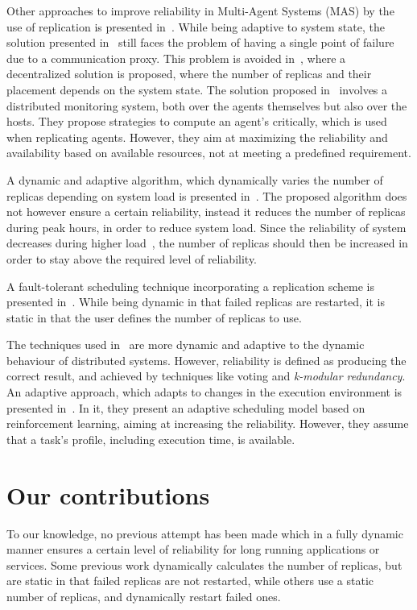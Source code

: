 \documentclass{cslthse-msc}
\begin{document}
Other approaches to improve reliability in Multi-Agent Systems (MAS) by the use of replication is presented in~\cite{replicatingAgents, adaptiveMASReplication, adaptiveAgentReplication}. While being adaptive to system state, the solution presented in~\cite{replicatingAgents} still faces the problem of having a single point of failure due to a communication proxy. This problem is avoided in~\cite{adaptiveMASReplication}, where a decentralized solution is proposed, where the number of replicas and their placement depends on the system state. %
The solution proposed in~\cite{adaptiveAgentReplication} involves a distributed monitoring system, both over the agents themselves but also over the hosts. They propose strategies to compute an agent's critically, which is used when replicating agents. However, they aim at maximizing the reliability and availability based on available resources, not at meeting a predefined requirement. %

A dynamic and adaptive algorithm, which dynamically varies the number of replicas depending on system load is presented in~\cite{adaptiveCheckPointAndRep}. The proposed algorithm does not however ensure a certain reliability, instead it reduces the number of replicas during peak hours, in order to reduce system load. Since the reliability of system decreases during higher load~\cite{studyOfFailures, implicationsOfFailures}, the number of replicas should then be increased in order to stay above the required level of reliability.

A fault-tolerant scheduling technique incorporating a replication scheme is presented in~\cite{faultTolerantSchedPolicy}. While being dynamic in that failed replicas are restarted, it is static in that the user defines the number of replicas to use.

The techniques used in~\cite{selfAdaptRel, dynAdaptRepl, relModelWebServices} are more dynamic and adaptive to the dynamic behaviour of distributed systems. However, reliability is defined as producing the correct result, and achieved by techniques like voting and \emph{k-modular redundancy}. An adaptive approach, which adapts to changes in the execution environment is presented in~\cite{imprRelAdaptRL}. In it, they present an adaptive scheduling model based on reinforcement learning, aiming at increasing the reliability. However, they assume that a task's profile, including execution time, is available.

\section{Our contributions} \label{sec:introduction_contributions}
To our knowledge, no previous attempt has been made which in a fully dynamic manner ensures a certain level of reliability for long running applications or services. Some previous work dynamically calculates the number of replicas, but are static in that failed replicas are not restarted, while others use a static number of replicas, and dynamically restart failed ones.
\end{document}
